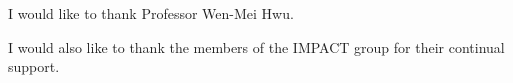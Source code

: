 I would like to thank Professor Wen-Mei Hwu.

I would also like to thank the members of the IMPACT group for their continual support.